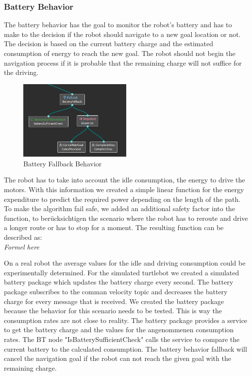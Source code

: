 \subsubsection{Battery Behavior}

The battery behavior has the goal to monitor the robot's battery and has to make to the decision if the robot should navigate to a new goal location or not. The decision is based on the current battery charge and the estimated consumption of energy to reach the new goal. The robot should not begin the navigation process if it is probable that the remaining charge will not suffice for the driving.

\begin{figure}
	\includegraphics[width=0.5\textwidth]{images/battery_fallback.png}
	\caption{Battery Fallback Behavior}
\end{figure}
The robot has to take into account the idle consumption, the energy to drive the motors. With this information we created a simple linear function for the energy expenditure to predict the required power depending on the length of the path. To make the algorithm fail safe, we added an additional safety factor into the function, to berücksichtigen the scenario where the robot has to reroute and drive a longer route or has to stop for a moment. The resulting function can be described as: \\

\textit{Formel here}

On a real robot the average values for the idle and driving consumption could be experimentally determined. For the simulated turtlebot we created a simulated battery package which updates the battery charge every second. The battery package subscribes to the comman velocity topic and decreases the battery charge for every message that is received. We created the battery package because the behavior for this scenario needs to be tested. This is way the consumption rates are not close to reality.
The battery package provides a service to get the battery charge and the values for the angenommenen consumption rates. The BT node "IsBatterySufficientCheck" calls the service to compare the current battery to the calculated consumption. The battery behavior fallback will cancel the navigation goal if the robot can not reach the given goal with the remaining charge. \\

